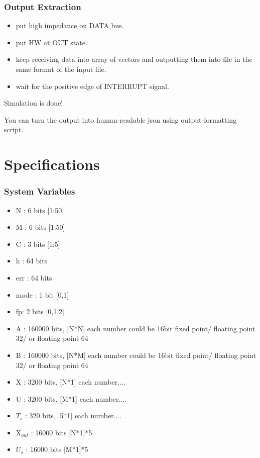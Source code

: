 \documentclass[12pt]{report}
\begin{document}
\section{Output Extraction}
\begin{itemize}
    \item put high impedance on {DATA} bus.
    \item put HW at OUT state.
    \item keep receiving data into array of vectors and outputting them into file in the same format of the input file.
    \item wait for the positive edge of {INTERRUPT} signal. 
\end{itemize}
Simulation is done! 

You can turn the output into human-readable json using output-formatting script.

\part{Specifications}

\section{System Variables}
\begin{itemize}
    \item N : 6 bits [1:50]
    \item M : 6 bits [1:50]
    \item C : 3 bits [1:5]
    \item h : 64 bits
    \item err : 64 bits
    \item mode : 1 bit [0,1]
    \item fp: 2 bits [0,1,2]
    \item A : 160000 bits, [N*N] each number could be 16bit fixed point/ floating point 32/ or floating point 64
    \item B : 160000 bits, [N*M] each number could be 16bit fixed point/ floating point 32/ or floating point 64
    \item X : 3200 bits, [N*1] each number....
    \item U : 3200 bits, [M*1] each number....
    \item $T_{s}$ : 320 bits, [5*1] each number....
    \item X$_{out}$ : 16000 bits [N*1]*5
    \item $U_s$ : 16000 bits [M*1]*5
\end{itemize}
\end{document}

